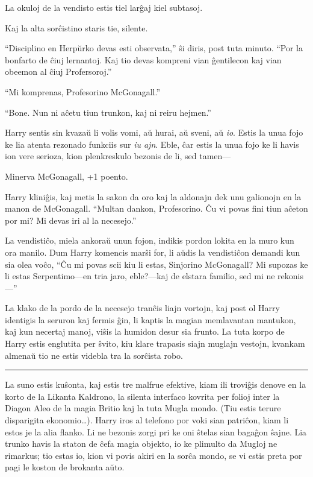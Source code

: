 La okuloj de la vendisto estis tiel larĝaj kiel subtasoj.

Kaj la alta sorĉistino staris tie, silente.

``Disciplino en Herpŭrko devas esti observata,'' ŝi diris, post tuta
minuto. ``Por la bonfarto de ĉiuj lernantoj. Kaj tio devas kompreni
vian ĝentilecon kaj vian obeemon al ĉiuj Profersoroj.''

``Mi komprenas, Profesorino McGonagall.''

``Bone. Nun ni aĉetu tiun trunkon, kaj ni reiru hejmen.''

Harry sentis sin kvazaŭ li volis vomi, aŭ hurai, aŭ sveni, aŭ
\emph{io}. Estis la unua fojo ke lia atenta rezonado funkciis sur
\emph{iu ajn}. Eble, ĉar estis la unua fojo ke li havis ion vere
serioza, kion plenkreskulo bezonis de li, sed tamen—

Minerva McGonagall, +1 poento.

Harry kliniĝis, kaj metis la sakon da oro kaj la aldonajn dek unu
galionojn en la manon de McGonagall. ``Multan dankon, Profesorino. Ĉu
vi povas fini tiun aĉeton por mi? Mi devas iri al la necesejo.''

La vendistiĉo, miela ankoraŭ unun fojon, indikis pordon lokita en la
muro kun ora manilo. Dum Harry komencis marŝi for, li aŭdis la
vendistiĉon demandi kun sia olea voĉo, ``Ĉu mi povas scii kiu li
estas, Sinjorino McGonagall? Mi supozas ke li estas Serpentimo—en tria
jaro, eble?—kaj de elstara familio, sed mi ne rekonis—''

La klako de la pordo de la necesejo tranĉis liajn vortojn, kaj post ol
Harry identigis la seruron kaj fermis ĝin, li kaptis la magian
memlavantan mantukon, kaj kun necertaj manoj, viŝis la humidon desur
sia frunto. La tuta korpo de Harry estis englutita per ŝvito, kiu
klare trapasis siajn muglajn vestojn, kvankam almenaŭ tio ne estis
videbla tra la sorĉista robo.

\begin{center}\rule{3in}{0.4pt}\end{center}

La suno estis kuŝonta, kaj estis tre malfrue efektive, kiam ili
troviĝis denove en la korto de la Likanta Kaldrono, la silenta
interfaco kovrita per folioj inter la Diagon Aleo de la magia Britio
kaj la tuta Mugla mondo. (Tiu estis terure disparigita
ekonomio\ldots). Harry iros al telefono por voki sian patriĉon, kiam
li estos je la alia flanko. Li ne bezonis zorgi pri ke oni ŝtelas sian
bagaĝon ŝajne. Lia trunko havis la staton de ĉefa magia objekto, io ke
plimulto da Mugloj ne rimarkus; tio estas io, kion vi povis akiri en
la sorĉa mondo, se vi estis preta por pagi le koston de brokanta aŭto.

